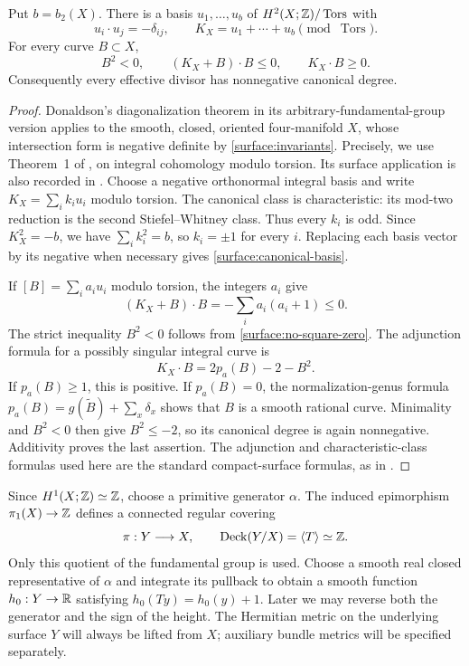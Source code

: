 \begin{lemma}\label{surface:degree}
Put $b=b_2(X)$. There is a basis $u_1,\ldots,u_b$ of
$H^2(X;\mathbb Z)/\operatorname{Tors}$ with
\begin{equation}\label{surface:canonical-basis}
 u_i\cdot u_j=-\delta_{ij},\qquad
 K_X=u_1+\cdots+u_b\pmod{\operatorname{Tors}}.
\end{equation}
For every curve $B\subset X$,
\begin{equation}\label{surface:curve-degrees}
 B^2<0,\qquad (K_X+B)\cdot B\leq0,\qquad K_X\cdot B\geq0.
\end{equation}
Consequently every effective divisor has nonnegative canonical degree.
\end{lemma}

\begin{proof}
Donaldson's diagonalization theorem in its arbitrary-fundamental-group
version applies to the smooth, closed, oriented four-manifold $X$, whose
intersection form is negative definite by \eqref{surface:invariants}.
Precisely, we use Theorem~1 of \cite{Donaldson1987}, on integral cohomology
modulo torsion. Its surface application is also recorded in
\cite[\S1.1, p.~1756]{Teleman2010}.
Choose a negative orthonormal integral basis and write
$K_X=\sum_i k_i u_i$ modulo torsion. The canonical class is characteristic:
its mod-two reduction is the second Stiefel--Whitney class. Thus every $k_i$
is odd. Since $K_X^2=-b$, we have $\sum_i k_i^2=b$, so $k_i=\pm1$ for
every $i$. Replacing each basis vector by its negative when necessary gives
\eqref{surface:canonical-basis}.

If $[B]=\sum_i a_i u_i$ modulo torsion, the integers $a_i$ give
\[
 (K_X+B)\cdot B=-\sum_i a_i(a_i+1)\leq0.
\]
The strict inequality $B^2<0$ follows from
\eqref{surface:no-square-zero}. The adjunction formula for a possibly
singular integral curve is
\[
 K_X\cdot B=2p_a(B)-2-B^2.
\]
If $p_a(B)\geq1$, this is positive. If $p_a(B)=0$, the normalization-genus
formula $p_a(B)=g(\widetilde B)+\sum_x\delta_x$ shows that $B$ is a smooth
rational curve. Minimality and $B^2<0$ then give $B^2\leq-2$, so its
canonical degree is again nonnegative. Additivity proves the last assertion.
The adjunction and characteristic-class formulas used here are the standard
compact-surface formulas, as in \cite{BHPV2004}.
\end{proof}

Since $H^1(X;\mathbb Z)\simeq\mathbb Z$, choose a primitive generator $\alpha$.
The induced epimorphism $\pi_1(X)\to\mathbb Z$ defines a connected regular
covering
\[
 \pi:Y\longrightarrow X,
 \qquad \operatorname{Deck}(Y/X)=\langle T\rangle\simeq\mathbb Z.
\]
Only this quotient of the fundamental group is used. Choose a smooth real
closed representative of $\alpha$ and integrate its pullback to obtain a
smooth function $h_0:Y\to\mathbb R$ satisfying
$h_0(Ty)=h_0(y)+1$. Later we may reverse both the generator and the sign of
the height. The Hermitian metric on the underlying surface $Y$ will always
be lifted from $X$; auxiliary bundle metrics will be specified separately.

